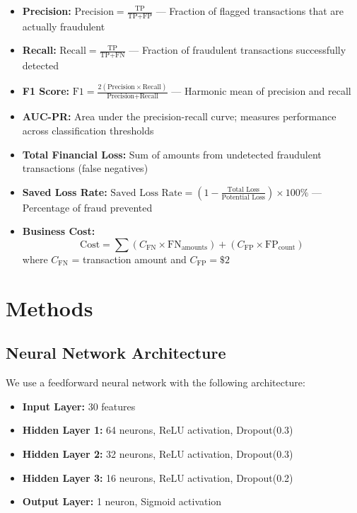 \documentclass[10pt,twocolumn,letterpaper]{article}
\begin{document}
\begin{itemize}
  \item \textbf{Precision:} $\text{Precision} = \frac{\text{TP}}{\text{TP} + \text{FP}}$ — Fraction of flagged transactions that are actually fraudulent
  
  \item \textbf{Recall:} $\text{Recall} = \frac{\text{TP}}{\text{TP} + \text{FN}}$ — Fraction of fraudulent transactions successfully detected
  
  \item \textbf{F1 Score:} $\text{F1} = \frac{2(\text{Precision} \times \text{Recall})}{\text{Precision} + \text{Recall}}$ — Harmonic mean of precision and recall
  
  \item \textbf{AUC-PR:} Area under the precision-recall curve; measures performance across classification thresholds
  
  \item \textbf{Total Financial Loss:} Sum of amounts from undetected fraudulent transactions (false negatives)
  
  \item \textbf{Saved Loss Rate:} $\text{Saved Loss Rate} = \left(1 - \frac{\text{Total Loss}}{\text{Potential Loss}}\right) \times 100\%$ — Percentage of fraud prevented
  
  \item \textbf{Business Cost:} 
  \begin{equation}
    \text{Cost} = \sum \left( C_{\text{FN}} \times \text{FN}_{\text{amounts}} \right) + (C_{\text{FP}} \times \text{FP}_{\text{count}})
  \end{equation}
  where $C_{\text{FN}}$ = transaction amount and $C_{\text{FP}} = \$2$
\end{itemize}

\section{Methods}
\subsection{Neural Network Architecture}

We use a feedforward neural network with the following architecture:

\begin{itemize}
  \item \textbf{Input Layer:} 30 features
  \item \textbf{Hidden Layer 1:} 64 neurons, ReLU activation, Dropout(0.3)
  \item \textbf{Hidden Layer 2:} 32 neurons, ReLU activation, Dropout(0.3)
  \item \textbf{Hidden Layer 3:} 16 neurons, ReLU activation, Dropout(0.2)
  \item \textbf{Output Layer:} 1 neuron, Sigmoid activation
\end{itemize}
\end{document}
